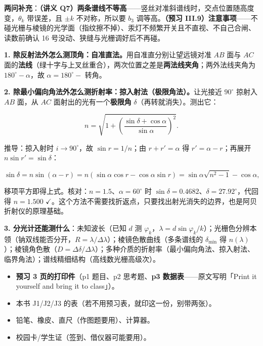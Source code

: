\textbf{两问补充}：\textbf{（讲义 Q7）两条谱线不等高}——竖丝对准斜谱线时，交点位置随高度变，$\theta_k$ 带误差，且 $\pm k$ 不对称，所以要 $b_3$ 调等高。\textbf{（预习 III.9）注意事项}——不碰光栅与棱镜的光学面（指纹擦不掉）、汞灯不频繁开关且不直视、不自己合闸、读数前确认 16 号没动、狭缝与光栅调好后不再碰。


\textbf{1. 除反射法外怎么测顶角：自准直法。}用自准直分别让望远镜对准 $AB$ 面与 $AC$ 面的\textbf{法线}（绿十字与上叉丝重合），两次位置之差是\textbf{两法线夹角}；两外法线夹角为 $180^{\circ}-\alpha$，故 $\alpha=180^{\circ}-$ 转角。


\textbf{2. 除最小偏向角法外怎么测折射率：掠入射法（极限角法）。}让光接近 $90^{\circ}$ 掠射入 $AB$ 面，从 $AC$ 面射出的光有一个\textbf{极限角} $\delta$（再转就消失）。测出它：

\[
n=\sqrt{1+\left(\frac{\sin\delta+\cos\alpha}{\sin\alpha}\right)^{2}}.
\]

推导：掠入射时 $i\to90^{\circ}$，故 $\sin r=1/n$；由 $r+r'=\alpha$ 得 $r'=\alpha-r$；再展开 $n\sin r'=\sin\delta$：

\[
\sin\delta=n\sin(\alpha-r)=n(\sin\alpha\cos r-\cos\alpha\sin r)=\sin\alpha\sqrt{n^{2}-1}-\cos\alpha,
\]

移项平方即得上式。核对：$n=1.5$、$\alpha=60^{\circ}$ 时 $\sin\delta=0.4682$、$\delta=27.92^{\circ}$，代回得 $n=1.500$ $\checkmark$。这个方法不需要找折返点，只要找出射光消失的边界，也是阿贝折射仪的原理基础。

\textbf{3. 分光计还能测什么}：未知波长（已知 $d$ 测 $\varphi_k$，$\lambda=d\sin\varphi_k/k$）；光栅色分辨本领（钠双线能否分开，$R=\lambda/\Delta\lambda$）；棱镜色散曲线（多条谱线的 $\delta_{\min}$ 得 $n(\lambda)$）；棱镜角色散（$D=\Delta\delta/\Delta\lambda$）；多种介质的折射率（最小偏向角法、掠入射法、临界角法）；谱线精细结构（高线数光栅高级次）。


\begin{itemize}
\item \textbf{预习 3 页的打印件}（p1 题目、p2 思考题、\textbf{p3 数据表}——原文写明「Print it yourself and bring it to class」）。
\item 本书 J1/J2/J3 的表（若不用预习表，就印这一份，别带两张）。
\item 铅笔、橡皮、直尺（作图题要用）、计算器。
\item 校园卡/学生证（签到、借仪器可能要用）。
\end{itemize}

\vspace{6pt}
\begin{center}
{\color{petal}\small\ornstar}\hspace{6pt}{\color{petal}\small\ornstar}
\end{center}
